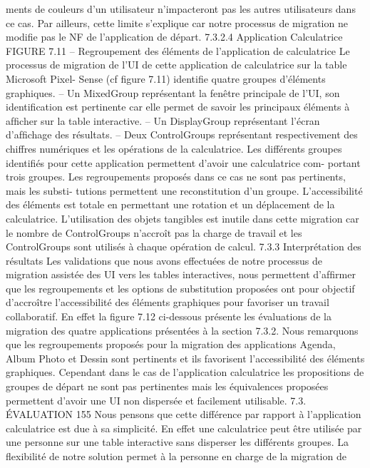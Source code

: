 \documentclass{article}
\begin{document}
ments de couleurs d’un utilisateur n’impacteront pas les autres utilisateurs dans ce cas. Par ailleurs,
cette limite s’explique car notre processus de migration ne modiﬁe pas le NF de l’application de
départ.
7.3.2.4
Application Calculatrice
FIGURE 7.11 – Regroupement des éléments de l’application de calculatrice
Le processus de migration de l’UI de cette application de calculatrice sur la table Microsoft Pixel-
Sense (cf ﬁgure 7.11) identiﬁe quatre groupes d’éléments graphiques.
– Un MixedGroup représentant la fenêtre principale de l’UI, son identiﬁcation est pertinente car
elle permet de savoir les principaux éléments à afﬁcher sur la table interactive.
– Un DisplayGroup représentant l’écran d’afﬁchage des résultats.
– Deux ControlGroups représentant respectivement des chiffres numériques et les opérations de
la calculatrice.
Les différents groupes identiﬁés pour cette application permettent d’avoir une calculatrice com-
portant trois groupes. Les regroupements proposés dans ce cas ne sont pas pertinents, mais les substi-
tutions permettent une reconstitution d’un groupe. L’accessibilité des éléments est totale en permettant
une rotation et un déplacement de la calculatrice. L’utilisation des objets tangibles est inutile dans cette
migration car le nombre de ControlGroups n’accroît pas la charge de travail et les ControlGroups sont
utilisés à chaque opération de calcul.
7.3.3
Interprétation des résultats
Les validations que nous avons effectuées de notre processus de migration assistée des UI vers
les tables interactives, nous permettent d’afﬁrmer que les regroupements et les options de substitution
proposées ont pour objectif d’accroître l’accessibilité des éléments graphiques pour favoriser un travail
collaboratif.
En effet la ﬁgure 7.12 ci-dessous présente les évaluations de la migration des quatre applications
présentées à la section 7.3.2. Nous remarquons que les regroupements proposés pour la migration
des applications Agenda, Album Photo et Dessin sont pertinents et ils favorisent l’accessibilité des
éléments graphiques. Cependant dans le cas de l’application calculatrice les propositions de groupes
de départ ne sont pas pertinentes mais les équivalences proposées permettent d’avoir une UI non
dispersée et facilement utilisable.
7.3. ÉVALUATION
155
Nous pensons que cette différence par rapport à l’application calculatrice est due à sa simplicité.
En effet une calculatrice peut être utilisée par une personne sur une table interactive sans disperser les
différents groupes. La ﬂexibilité de notre solution permet à la personne en charge de la migration de
\end{document}
